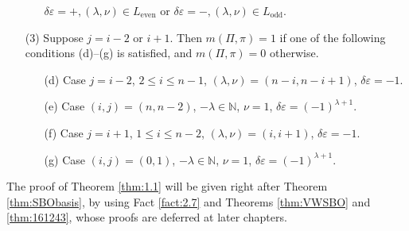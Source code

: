 \begin{theorem}
\begin{enumerate}
\begin{enumerate}
$\delta \varepsilon=+, (\lambda, \nu) \in L_{\operatorname{even}}
$
 or 
$
\delta \varepsilon=-, 
(\lambda, \nu) \in L_{\operatorname{odd}}.   
$
\end{enumerate}
\item[{\rm{(3)}}]
Suppose $j=i-2$ or $i+1$.  
Then $m(\Pi,\pi)=1$ 
 if one of the following conditions {\rm{(d)--(g)}}
 is satisfied, 
 and $m(\Pi,\pi)=0$ otherwise.  
\begin{enumerate}
\item[{\rm{(d)}}]
Case $j=i-2$, $2 \le i \le n-1$, $(\lambda, \nu)=(n-i,n-i+1)$, 
$\delta \varepsilon =-1$.  
\item[{\rm{(e)}}]
Case $(i,j)=(n,n-2)$, $-\lambda \in {\mathbb{N}}$, $\nu=1$, 
$\delta \varepsilon =(-1)^{\lambda+1}$.  
\item[{\rm{(f)}}]
Case $j=i+1$, $1 \le i \le n-2$, $(\lambda, \nu)=(i,i+1)$, 
$\delta \varepsilon =-1$.  
\item[{\rm{(g)}}]
Case $(i,j)=(0,1)$, $-\lambda \in {\mathbb{N}}$, $\nu=1$, 
$\delta \varepsilon =(-1)^{\lambda+1}$.  
\end{enumerate}
\end{enumerate}
\end{theorem}


The proof of Theorem \ref{thm:1.1} will be given right after Theorem \ref{thm:SBObasis}, 
by using Fact \ref{fact:2.7}
 and Theorems \ref{thm:VWSBO} and \ref{thm:161243}, 
 whose proofs are deferred at later chapters.  

